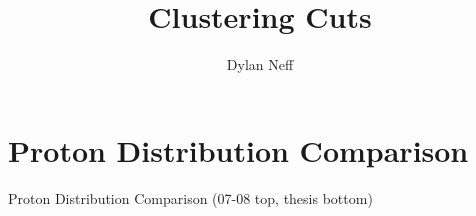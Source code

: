 \documentclass{beamer}
\author{Dylan Neff}
\title{Clustering Cuts}
\begin{document}
\frame{\titlepage}



\section{Proton Distribution Comparison}

\begin{frame}{Proton Distribution Comparison (07-08 top, thesis bottom)}

\begin{center}
\end{center}
\begin{center}
\end{center}

\end{frame}
\end{document}
